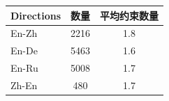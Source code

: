 \begin{table}[htbp]
\centering
{}
\footnotesize
\begin{tabular}{lcc}
\toprule
\textbf{Directions} & \textbf{数量} & \textbf{平均约束数量} \\
\midrule
En-Zh & 2216 & 1.8 \\
En-De & 5463 & 1.6 \\
En-Ru & 5008 & 1.7 \\
Zh-En & 480  & 1.7 \\
\bottomrule
\end{tabular}
\label{tab:method2-commt-stats}
\end{table}
